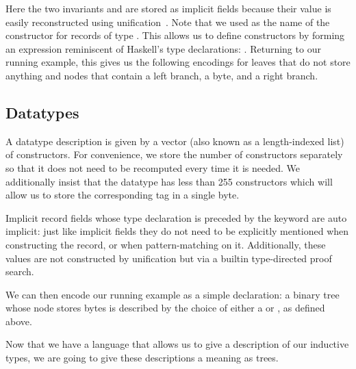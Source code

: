 Here the two invariants  and
 are stored as implicit fields
because their value is easily reconstructed using
unification~\citep{DBLP:conf/tlca/AbelP11}.
%
Note that we used \IdrisData{(::)} as the name of the
constructor for records of type .
This allows us to define constructors by forming an
expression reminiscent of Haskell's type declarations:
 \IdrisData{::} .
%
Returning to our running example, this gives us the following encodings for
leaves that do not store anything
and nodes that contain a left branch, a byte, and a right branch.

\noindent
\begin{minipage}[t]{.38\textwidth}
\end{minipage}\hfill
\begin{minipage}[t]{.58\textwidth}
\end{minipage}

\subsection{Datatypes}

A datatype description is given by a vector (also known as
a length-indexed list) of constructors.
%
For convenience, we store the number of constructors separately so
that it does not need to be recomputed every time it is needed.
%
We additionally insist that the datatype has less than 255
constructors which will allow us to store the corresponding
tag in a single byte.


\begin{remark}
  Implicit record fields whose type declaration is preceded by the
   keyword are auto implicit: just like implicit
  fields they do not need to be explicitly mentioned when constructing
  the record, or when pattern-matching on it.
  Additionally, these values are not constructed by unification but
  via a builtin type-directed proof search.
\end{remark}

We can then encode our running example as a simple 
declaration: a binary tree whose node stores bytes is described by the choice
of either a  or , as defined above.

\label{fig:treedesc}

Now that we have a language that allows us to give a description of our
inductive types, we are going to give these descriptions a meaning as trees.
